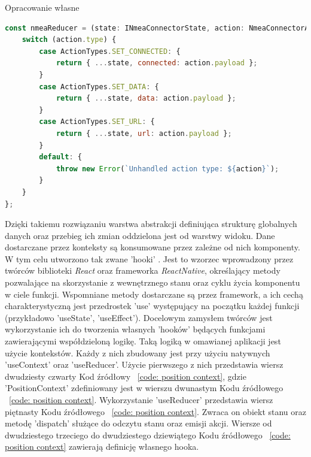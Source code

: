 \documentclass[skorowidz,skroty]{dyplomWEZUT}
\begin{document}
{Opracowanie własne}{\label{code: NMEA reducer}}
\begin{lstlisting}[language=JavaScript]
const nmeaReducer = (state: INmeaConnectorState, action: NmeaConnectorActions): INmeaConnectorState => {
    switch (action.type) {
        case ActionTypes.SET_CONNECTED: {
            return { ...state, connected: action.payload };
        }
        case ActionTypes.SET_DATA: {
            return { ...state, data: action.payload };
        }
        case ActionTypes.SET_URL: {
            return { ...state, url: action.payload };
        }
        default: {
            throw new Error(`Unhandled action type: ${action}`);
        }
    }
};
\end{lstlisting}

Dzięki takiemu rozwiązaniu warstwa abstrakcji definiująca strukturę globalnych danych oraz przebieg ich zmian oddzielona jest od warstwy widoku. Dane dostarczane przez konteksty są konsumowane przez zależne od nich komponenty. W tym celu utworzono tak zwane 'hooki' \cite{React}. Jest to wzorzec wprowadzony przez twórców biblioteki \textit{React} oraz frameworka \textit{ReactNative}, określający metody pozwalające na skorzystanie z wewnętrznego stanu oraz cyklu życia komponentu w ciele funkcji. Wspomniane metody dostarczane są przez framework, a ich cechą charakterystyczną jest przedrostek 'use' występujący na początku każdej funkcji (przykładowo 'useState', 'useEffect').  Docelowym zamysłem twórców jest wykorzystanie ich do tworzenia własnych 'hooków' będących funkcjami zawierającymi współdzieloną logikę. Taką logiką w omawianej aplikacji jest użycie kontekstów. Każdy z nich zbudowany jest przy użyciu natywnych  'useContext' oraz 'useReducer'. Użycie pierwszego z nich przedstawia wiersz dwudziesty czwarty  Kod źródłowy ~\ref{code: position context}, gdzie 'PositionContext' zdefiniowany jest w wierszu dwunastym Kodu źródłowego ~\ref{code: position context}. Wykorzystanie 'useReducer' przedstawia wiersz piętnasty Kodu źródłowego ~\ref{code: position context}. Zwraca on obiekt stanu oraz metodę 'dispatch' służące do odczytu stanu oraz emisji akcji. Wiersze od dwudziestego trzeciego do dwudziestego dziewiątego Kodu źródłowego ~\ref{code: position context} zawierają definicję własnego hooka.
   
\end{document}
